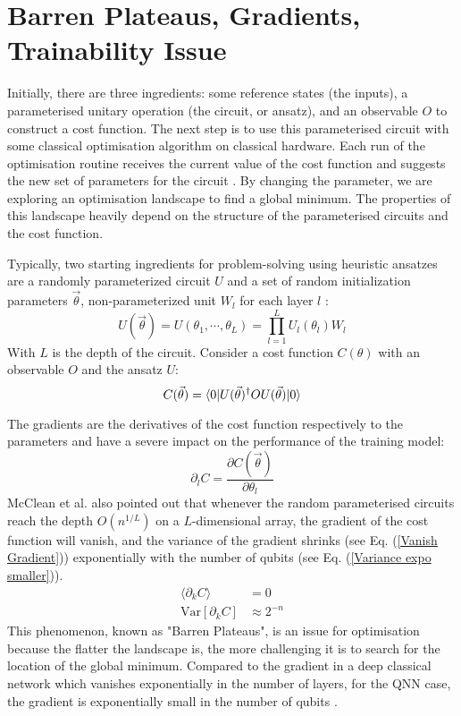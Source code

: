 \section{Barren Plateaus, Gradients, Trainability Issue}
Initially, there are three ingredients: some reference states (the inputs), a parameterised unitary operation (the circuit, or ansatz), and an observable $O$ to construct a cost function.
The next step is to use this parameterised circuit with some classical optimisation algorithm on classical hardware.
Each run of the optimisation routine receives the current value of the cost function and suggests the new set of parameters for the circuit \cite{cerezo2021variational}.
By changing the parameter, we are exploring an optimisation landscape to find a global minimum.
The properties of this landscape heavily depend on the structure of the parameterised circuits and the cost function.

Typically, two starting ingredients for problem-solving using heuristic ansatzes are a randomly parameterized circuit $U$ and a set of random initialization parameters $\vec{\theta}$, non-parameterized unit $W_l$ for each layer $l$ \cite{mccleanBarrenPlateausQuantum2018}:
\begin{equation}\label{Parameterized Circuit}
    U(\vec{\theta})
    = U(\theta_1, \cdots, \theta_L)
    = \prod_{l=1}^L U_l(\theta_l)W_l
\end{equation}
With $L$ is the depth of the circuit. Consider a cost function $C(\theta)$ with an observable $O$ and the ansatz $U$:
\begin{equation}
    C(\vec{\theta})
    = \bra{0} U(\vec{\theta})^\dagger OU(\vec{\theta}) \ket{0}
\end{equation}

The gradients are the derivatives of the cost function respectively to the parameters and have a severe impact on the performance of the training model:
\begin{equation}
    \partial_l C = \frac{\partial C(\vec{\theta})}{\partial\theta_l}
\end{equation}
McClean et al. \cite{mccleanBarrenPlateausQuantum2018} also pointed out that whenever the random parameterised circuits reach the depth $O(n^{1/L})$ on a $L$-dimensional array, the gradient of the cost function will vanish, and the variance of the gradient shrinks (see Eq. (\ref{Vanish Gradient})) exponentially with the number of qubits (see Eq. (\ref{Variance expo smaller})).
\begin{align}
    \langle \partial_k C\rangle &= 0  \label{Vanish Gradient}\\
    \mathrm{Var}[\partial_k C] &\approx 2^{-n}  \label{Variance expo smaller}
\end{align}
This phenomenon, known as "Barren Plateaus", is an issue for optimisation because the flatter the landscape is, the more challenging it is to search for the location of the global minimum.
Compared to the gradient in a deep classical network which vanishes exponentially in the number of layers, for the QNN case, the gradient is exponentially small in the number of qubits \cite{mccleanBarrenPlateausQuantum2018}.

